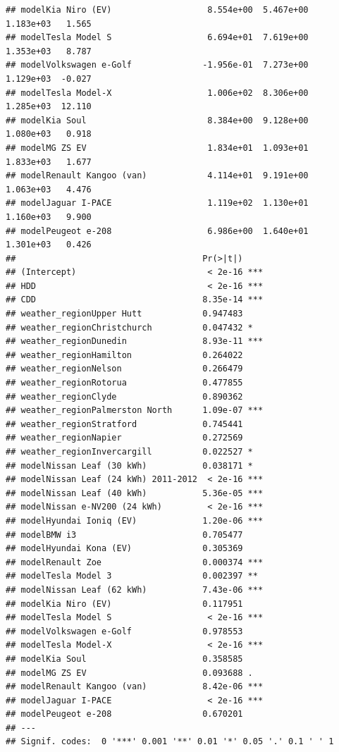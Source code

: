\documentclass[
]{article}
\begin{document}
\begin{verbatim}
## modelKia Niro (EV)                   8.554e+00  5.467e+00  1.183e+03   1.565
## modelTesla Model S                   6.694e+01  7.619e+00  1.353e+03   8.787
## modelVolkswagen e-Golf              -1.956e-01  7.273e+00  1.129e+03  -0.027
## modelTesla Model-X                   1.006e+02  8.306e+00  1.285e+03  12.110
## modelKia Soul                        8.384e+00  9.128e+00  1.080e+03   0.918
## modelMG ZS EV                        1.834e+01  1.093e+01  1.833e+03   1.677
## modelRenault Kangoo (van)            4.114e+01  9.191e+00  1.063e+03   4.476
## modelJaguar I-PACE                   1.119e+02  1.130e+01  1.160e+03   9.900
## modelPeugeot e-208                   6.986e+00  1.640e+01  1.301e+03   0.426
##                                     Pr(>|t|)    
## (Intercept)                          < 2e-16 ***
## HDD                                  < 2e-16 ***
## CDD                                 8.35e-14 ***
## weather_regionUpper Hutt            0.947483    
## weather_regionChristchurch          0.047432 *  
## weather_regionDunedin               8.93e-11 ***
## weather_regionHamilton              0.264022    
## weather_regionNelson                0.266479    
## weather_regionRotorua               0.477855    
## weather_regionClyde                 0.890362    
## weather_regionPalmerston North      1.09e-07 ***
## weather_regionStratford             0.745441    
## weather_regionNapier                0.272569    
## weather_regionInvercargill          0.022527 *  
## modelNissan Leaf (30 kWh)           0.038171 *  
## modelNissan Leaf (24 kWh) 2011-2012  < 2e-16 ***
## modelNissan Leaf (40 kWh)           5.36e-05 ***
## modelNissan e-NV200 (24 kWh)         < 2e-16 ***
## modelHyundai Ioniq (EV)             1.20e-06 ***
## modelBMW i3                         0.705477    
## modelHyundai Kona (EV)              0.305369    
## modelRenault Zoe                    0.000374 ***
## modelTesla Model 3                  0.002397 ** 
## modelNissan Leaf (62 kWh)           7.43e-06 ***
## modelKia Niro (EV)                  0.117951    
## modelTesla Model S                   < 2e-16 ***
## modelVolkswagen e-Golf              0.978553    
## modelTesla Model-X                   < 2e-16 ***
## modelKia Soul                       0.358585    
## modelMG ZS EV                       0.093688 .  
## modelRenault Kangoo (van)           8.42e-06 ***
## modelJaguar I-PACE                   < 2e-16 ***
## modelPeugeot e-208                  0.670201    
## ---
## Signif. codes:  0 '***' 0.001 '**' 0.01 '*' 0.05 '.' 0.1 ' ' 1
\end{verbatim}
\end{document}
